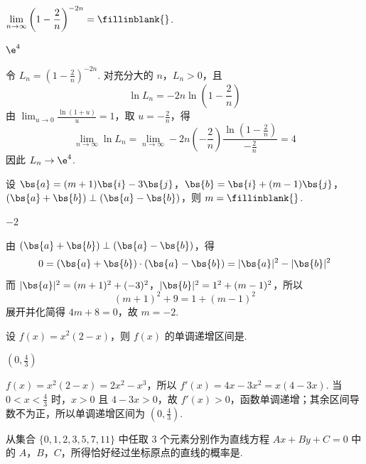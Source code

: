 \documentclass[UTF8,a4paper,oneside,11pt]{ctexbook}
\begin{document}
\setcounter{probnum}{12}
\begin{problem}[B]
\(\displaystyle\lim_{n\to\infty}\left(1-\frac{2}{n}\right)^{-2n}=\fillinblank{}\).
\end{problem}

\begin{answer}
\(\e^4\)
\end{answer}

\begin{solution}
令 \(L_n=\left(1-\frac2n\right)^{-2n}\). 对充分大的 \(n\)，\(L_n>0\)，且
\[
\ln L_n=-2n\ln\left(1-\frac2n\right)
\]
由 \(\displaystyle\lim_{u\to0}\frac{\ln(1+u)}{u}=1\)，取 \(u=-\frac2n\)，得
\[
\lim_{n\to\infty}\ln L_n
=\lim_{n\to\infty}-2n\left(-\frac2n\right)\frac{\ln\left(1-\frac2n\right)}{-\frac2n}=4
\]
因此 \(L_n\to\e^4\).
\end{solution}

\begin{problem}[B]
设 \(\bs{a}=(m+1)\bs{i}-3\bs{j}\)，\(\bs{b}=\bs{i}+(m-1)\bs{j}\)，\(\left(\bs{a}+\bs{b}\right)\perp\left(\bs{a}-\bs{b}\right)\)，则 \(m=\fillinblank{}\).
\end{problem}

\begin{answer}
\(-2\)
\end{answer}

\begin{solution}
由 \((\bs{a}+\bs{b})\perp(\bs{a}-\bs{b})\)，得
\[
0=(\bs{a}+\bs{b})\cdot(\bs{a}-\bs{b})=|\bs{a}|^2-|\bs{b}|^2
\]
而 \(|\bs{a}|^2=(m+1)^2+(-3)^2\)，\(|\bs{b}|^2=1^2+(m-1)^2\)，所以
\[
(m+1)^2+9=1+(m-1)^2
\]
展开并化简得 \(4m+8=0\)，故 \(m=-2\).
\end{solution}

\begin{problem}[B]
设 \(f(x)=x^2(2-x)\)，则 \(f(x)\) 的单调递增区间是\fillinblank{}.
\end{problem}

\begin{answer}
\(\left(0,\frac{4}{3}\right)\)
\end{answer}

\begin{solution}
\(f(x)=x^2(2-x)=2x^2-x^3\)，所以
\(f'(x)=4x-3x^2=x(4-3x)\).
当 \(0<x<\frac43\) 时，\(x>0\) 且 \(4-3x>0\)，故 \(f'(x)>0\)，函数单调递增；其余区间导数不为正，所以单调递增区间为 \(\left(0,\frac43\right)\).
\end{solution}

\begin{problem}[B]
从集合 \(\{0,1,2,3,5,7,11\}\) 中任取 \(3\) 个元素分别作为直线方程 \(Ax+By+C=0\) 中的 \(A\)，\(B\)，\(C\)，所得恰好经过坐标原点的直线的概率是\fillinblank{}.
\end{problem}
\end{document}
